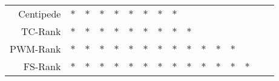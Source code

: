 \documentclass[11pt]{article}
\begin{document}
\begin{table}[h!]
\begin{center}
\begin{tabular}{ rccccccccccccccc }
    Centipede & $*$ & $*$ & $*$ & $*$ & $*$ & $*$ & $*$ & $*$ &     &     &     &     &     &     &     \\
    TC-Rank & $*$ & $*$ & $*$ & $*$ & $*$ & $*$ & $*$ & $*$ & $*$ &     &     &     &     &     &     \\
    PWM-Rank & $*$ & $*$ & $*$ & $*$ & $*$ & $*$ & $*$ & $*$ & $*$ & $*$ & $*$ & $*$ &     &     &     \\
    FS-Rank & $*$ & $*$ & $*$ & $*$ & $*$ & $*$ & $*$ & $*$ & $*$ & $*$ & $*$ & $*$ & $*$ &     &     \\
    \hline
  \end{tabular}
\end{center}
\vspace{0.0cm}
\end{table}

\clearpage
\end{document}
